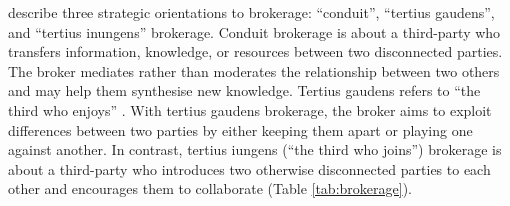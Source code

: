 \citet{obstfeld2014brokerage} describe three strategic orientations to brokerage: \enquote{conduit}, \enquote{tertius gaudens}, and \enquote{tertius inungens} brokerage. Conduit brokerage is about a third-party who transfers information, knowledge, or resources between two disconnected parties. The broker mediates rather than moderates the relationship between two others and may help them synthesise new knowledge. Tertius gaudens refers to \enquote{the third who enjoys} \citep{simmel1950sociology}. With tertius gaudens brokerage, the broker aims to exploit differences between two parties by either keeping them apart or playing one against another. In contrast, tertius iungens (\enquote{the third who joins}) brokerage is about a third-party who introduces two otherwise disconnected parties to each other and encourages them to collaborate (Table \ref{tab:brokerage}). \medskip



